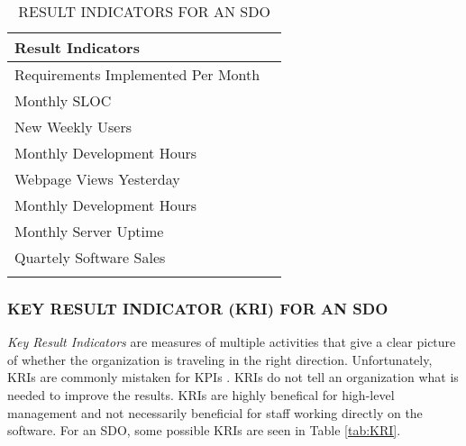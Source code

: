\documentclass[SDSUThesis.tex]{subfiles}
\begin{document}
            \begin{longtable}{@{}l l}
                \toprule%
                 \centering%
                 {\bfseries Result Indicators} &
                 \\
                
                \cmidrule[0.4pt](r{0.125em}){1-1}%
                \endhead
                
                Requirements Implemented Per Month  \\
                \myrowcolour%
                Monthly SLOC \\
                New Weekly Users \\
                \myrowcolour%
                Monthly Development Hours \\
                Webpage Views Yesterday \\
                \myrowcolour%
                Monthly Development Hours \\
                Monthly Server Uptime \\
                \myrowcolour%
                Quartely Software Sales \\
                
                \bottomrule
                
                \caption{RESULT INDICATORS FOR AN SDO}
                \label{tab:RI}
            \end{longtable}
            
        \subsubsection{KEY RESULT INDICATOR (KRI) FOR AN SDO}
            \textit{Key Result Indicators} are measures of multiple
            activities that give a clear picture of whether the
            organization is traveling in the right direction.  Unfortunately,
            KRIs are commonly mistaken for KPIs \cite{parmenter2010}.  KRIs
            do not tell an organization what is needed to improve the 
            results.  KRIs are highly benefical for high-level management
            and not necessarily beneficial for staff working directly on 
            the software.  For
            an SDO, some possible KRIs are seen in Table \ref{tab:KRI}.
            
\end{document}
